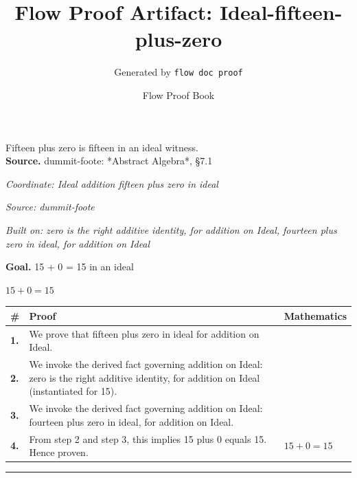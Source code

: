 \documentclass[11pt]{article}
\title{Flow Proof Artifact: Ideal-fifteen-plus-zero}
\author{Generated by \texttt{flow doc proof}}
\date{Flow Proof Book}
\theoremstyle{definition}
\begin{document}
\maketitle
Fifteen plus zero is fifteen in an ideal witness.\\[0.5em]
\textbf{Source.} dummit-foote: *Abstract Algebra*, §7.1\\[0.5em]
\bigskip
{}\par
\smallskip\noindent\textit{Coordinate: Ideal \cdot addition \cdot fifteen plus zero in ideal}\par
\smallskip\noindent\textit{Source: dummit-foote}\par
\smallskip\noindent\textit{Built on: zero is the right additive identity, for addition on Ideal, fourteen plus zero in ideal, for addition on Ideal}\par
\medskip
\noindent\textbf{Goal.} 15 + 0 = 15 in an ideal\par
\noindent$\displaystyle 15 + 0 = 15$\par
\medskip
\noindent
\begin{tabular}{@{} >{\raggedright\arraybackslash}p{} >{\raggedright\arraybackslash}p{} >{\raggedleft\arraybackslash}p{} @{}}
\textbf{\#} & \textbf{Proof} & \textbf{Mathematics} \\
\midrule
\textbf{1.} & We prove that fifteen plus zero in ideal for addition on Ideal. & \\[0.45em]
\textbf{2.} & We invoke the derived fact governing addition on Ideal: zero is the right additive identity, for addition on Ideal (instantiated for 15). & \\[0.45em]
\textbf{3.} & We invoke the derived fact governing addition on Ideal: fourteen plus zero in ideal, for addition on Ideal. & \\[0.45em]
\textbf{4.} & From step 2 and step 3, this implies 15 plus 0 equals 15. Hence proven. & $\displaystyle 15 + 0 = 15$ \\[0.45em]
\bottomrule
\end{tabular}
\label{thm:Ideal-addition-fifteen_plus_zero_in_ideal}
\par\medskip\hrule
\end{document}
